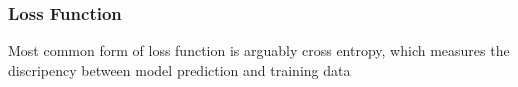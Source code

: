 \subsubsection{Loss Function}

Most common form of loss function is arguably cross entropy, which measures the discripency between model prediction and training data